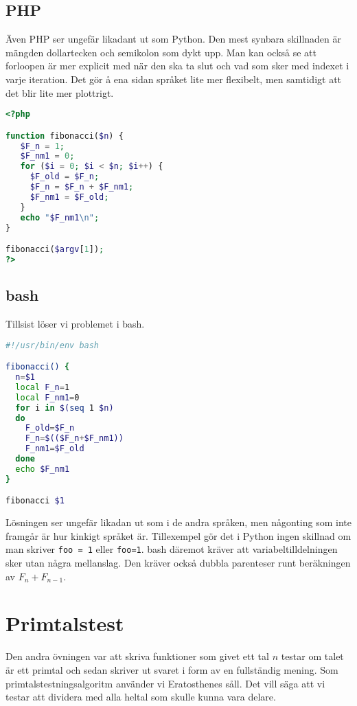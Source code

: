 \documentclass[10pt, twoside,a4paper]{article}
\begin{document}
\subsection{PHP}
Även PHP ser ungefär likadant ut som Python. Den mest synbara skillnaden är mängden dollartecken och semikolon som dykt upp. Man kan också se att forloopen är mer explicit med när den ska ta slut och vad som sker med indexet i varje iteration. Det gör å ena sidan språket lite mer flexibelt, men samtidigt att det blir lite mer plottrigt.
\begin{lstlisting}[language=PHP]
<?php

function fibonacci($n) {
   $F_n = 1;
   $F_nm1 = 0;
   for ($i = 0; $i < $n; $i++) {
     $F_old = $F_n;
     $F_n = $F_n + $F_nm1;
     $F_nm1 = $F_old;
   }
   echo "$F_nm1\n";
}

fibonacci($argv[1]);
?>
\end{lstlisting}

\newpage
\subsection{bash}
Tillsist löser vi problemet i bash.
\begin{lstlisting}[language=bash]
#!/usr/bin/env bash

fibonacci() {
  n=$1
  local F_n=1
  local F_nm1=0
  for i in $(seq 1 $n)
  do
    F_old=$F_n
    F_n=$(($F_n+$F_nm1))
    F_nm1=$F_old
  done
  echo $F_nm1
}

fibonacci $1
\end{lstlisting}
Lösningen ser ungefär likadan ut som i de andra språken, men någonting som inte framgår är hur kinkigt språket är. Tillexempel gör det i Python ingen skillnad om man skriver \verb+foo = 1+ eller \verb+foo=1+. bash däremot kräver att variabeltilldelningen sker utan några mellanslag. Den kräver också dubbla parenteser runt beräkningen av $F_n + F_{n-1}$.

\newpage
\section{Primtalstest}
Den andra övningen var att skriva funktioner som givet ett tal $n$ testar om talet är ett primtal och sedan skriver ut svaret i form av en fullständig mening. Som primtalstestningsalgoritm använder vi Eratosthenes såll. Det vill säga att vi testar att dividera med alla heltal som skulle kunna vara delare.
\end{document}
